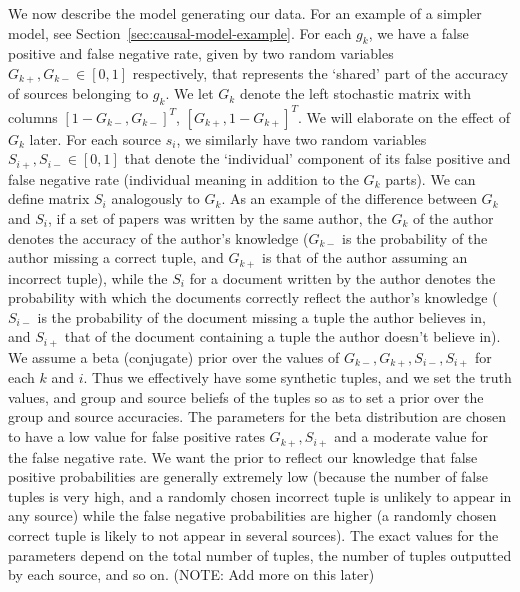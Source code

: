 \documentclass{sig-alternate}
\newcounter{prob}
\begin{document}
We now describe the model generating our data. For an example of a simpler model, see Section~\ref{sec:causal-model-example}. For each $g_k$, we have a false positive and false negative rate, given by two random variables $G_{k+},G_{k-} \in [0,1]$ respectively, that represents the `shared' part of the accuracy of sources belonging to $g_k$. We let $G_k$ denote the left stochastic matrix with columns $[1-G_{k-},G_{k-}]^T$, $[G_{k+},1-G_{k+}]^T$. We will elaborate on the effect of $G_k$ later. For each source $s_i$, we similarly have two random variables $S_{i+},S_{i-} \in [0,1]$ that denote the `individual' component of its false positive and false negative rate (individual meaning in addition to the $G_k$ parts). We can define matrix $S_i$ analogously to $G_k$. As an example of the difference between $G_k$ and $S_i$, if a set of papers was written by the same author, the $G_k$ of the author denotes the accuracy of the author's knowledge ($G_{k-}$ is the probability of the author missing a correct tuple, and $G_{k+}$ is that of the author assuming an incorrect tuple), while the $S_i$ for a document written by the author denotes the probability with which the documents correctly reflect the author's knowledge ($S_{i-}$ is the probability of the document missing a tuple the author believes in, and $S_{i+}$ that of the document containing a tuple the author doesn't believe in). We assume a beta (conjugate) prior over the values of $G_{k-}, G_{k+}, S_{i-}, S_{i+}$ for each $k$ and $i$. Thus we effectively have some synthetic tuples, and we set the truth values, and group and source beliefs of the tuples so as to set a prior over the group and source accuracies. The parameters for the beta distribution are chosen to have a low value for false positive rates $G_{k+}, S_{i+}$ and a moderate value for the false negative rate. We want the prior to reflect our knowledge that false positive probabilities are generally extremely low (because the number of false tuples is very high, and a randomly chosen incorrect tuple is unlikely to appear in any source) while the false negative probabilities are higher (a randomly chosen correct tuple is likely to not appear in several sources). The exact values for the parameters depend on the total number of tuples, the number of tuples outputted by each source, and so on. (NOTE: Add more on this later)
\end{document}
